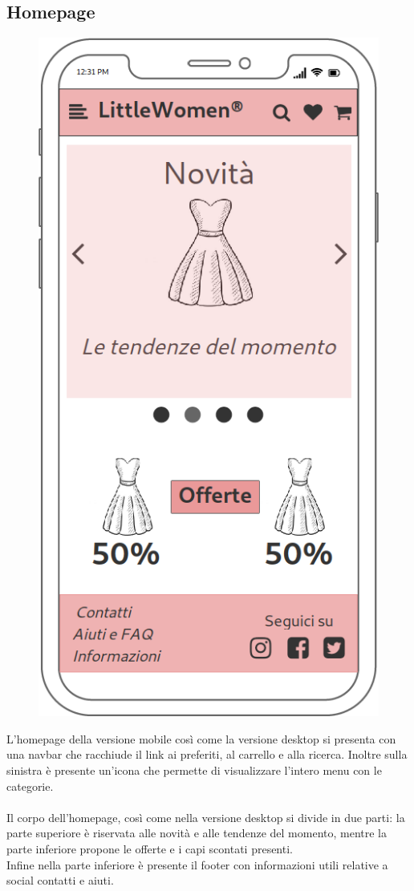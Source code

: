\documentclass[12pt,a4paper]{report}
\begin{document}
\subsection{Homepage}
\begin{figure}
\includegraphics[height=0.50\textheight]{"Project Management Sources/Wireframe/WireFrame Screenshot/Mobile/Homepage"}
\end{figure}
\vspace{5mm}
L'homepage della versione mobile  così come la versione desktop si presenta con una navbar che racchiude il link ai preferiti, al carrello e alla ricerca. Inoltre sulla sinistra è presente un'icona che permette di visualizzare l'intero menu con le categorie. \\\\Il corpo dell'homepage, così come nella versione desktop si divide in due parti: la parte superiore è riservata alle novità e alle tendenze del momento, mentre la parte inferiore propone le offerte e i capi scontati presenti.\\ Infine nella parte inferiore è presente il footer con informazioni utili relative a social contatti e aiuti.
\newpage
\end{document}
